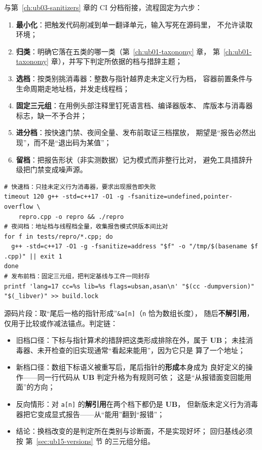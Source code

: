 \documentclass[12pt,a4paper,fontset=fandol]{ctexbook}
\newcommand{\Tp}[1]{\texttt{#1}}
\newcommand{\UB}{\textbf{\textsf{UB}}}
\begin{document}
与第~\ref{ch:ub03-sanitizers} 章的 CI 分档衔接，流程固定为六步：

\begin{enumerate}
  \item \textbf{最小化}：把触发代码削减到单一翻译单元，输入写死在源码里，
        不允许读取环境；
  \item \textbf{归类}：明确它落在五类的哪一类（第~\ref{ch:ub01-taxonomy} 章，
        第~\ref{ch:ub01-taxonomy} 章），并写下判定所依据的档与措辞主题；
  \item \textbf{选档}：按类别挑消毒器：整数与指针越界走未定义行为档，
        容器前置条件与生命周期走地址档，并发走线程档；
  \item \textbf{固定三元组}：在用例头部注释里钉死语言档、编译器版本、
        库版本与消毒器标志，缺一不予合并；
  \item \textbf{进分档}：按快速门禁、夜间全量、发布前取证三档摆放，
        期望是“报告必然出现”，而不是“退出码为某值”；
  \item \textbf{留档}：把报告形状（非实测数据）记为模式而非整行比对，
        避免工具措辞升级把门禁变成噪声源。
\end{enumerate}

\begin{lstlisting}[style=shellstyle, caption={shellstyle：六步流程落到 CI 三档的骨架}]
# 快速档：只挂未定义行为消毒器，要求出现报告即失败
timeout 120 g++ -std=c++17 -O1 -g -fsanitize=undefined,pointer-overflow \
    repro.cpp -o repro && ./repro
# 夜间档：地址档与线程档全量，收集报告模式供版本间比对
for f in tests/repro/*.cpp; do
  g++ -std=c++17 -O1 -g -fsanitize=address "$f" -o "/tmp/$(basename $f .cpp)" || exit 1
done
# 发布前档：固定三元组，把判定基线与工件一同封存
printf 'lang=17 cc=%s lib=%s flags=ubsan,asan\n' "$(cc -dumpversion)" "$(_libver)" >> build.lock
\end{lstlisting}

\begin{casebox}[title=同一越界依赖在两个标准档下的判定链]
源码片段：取“尾后一格的指针形成”\Tp{\&a[n]}（\Tp{n} 恰为数组长度），
随后\textbf{不解引用}，仅用于比较或作减法锚点。判定链：
\begin{itemize}
  \item 旧档口径：下标与指针算术的措辞把这类形成排除在外，属于 \UB{}；
        未挂消毒器、未开检查的旧实现通常“看起来能用”，因为它只是
        算了一个地址；
  \item 新档口径：数组下标语义被重写后，尾后指针的\textbf{形成}本身成为
        良好定义的操作——同一行代码从 \UB{} 判定升格为有规则可依；
        这是“从报错面变回能用面”的方向；
  \item 反向情形：对 \Tp{a[n]} 的\textbf{解引用}在两个档下都仍是 \UB{}，
        但新版未定义行为消毒器把它变成显式报告——从“能用”翻到“报错”；
  \item 结论：换档改变的是判定所在类别与诊断面，不是实现好坏；
        回归基线必须按 第~\ref{sec:ub15-versions} 节 的三元组分组。
\end{itemize}
\end{casebox}
\end{document}
